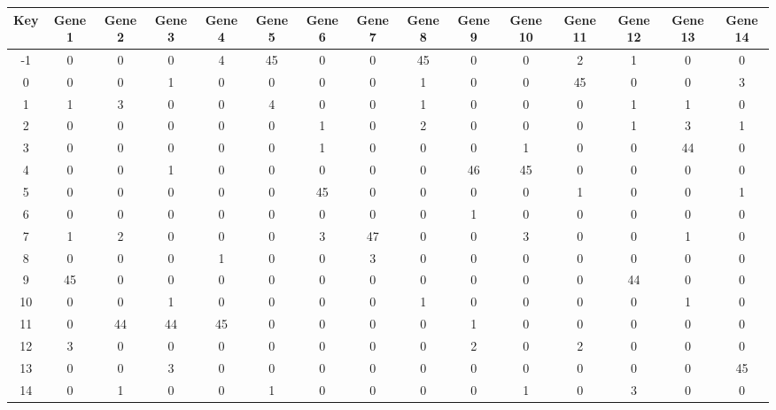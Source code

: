 \begin{tabular}{|c|c|c|c|c|c|c|c|c|c|c|c|c|c|c|}
\hline
Key & Gene 1 & Gene 2 & Gene 3 & Gene 4 & Gene 5 & Gene 6 & Gene 7 & Gene 8 & Gene 9 & Gene 10 & Gene 11 & Gene 12 & Gene 13 & Gene 14 \\
\hline
-1 & 0 & 0 & 0 & 4 & 45 & 0 & 0 & 45 & 0 & 0 & 2 & 1 & 0 & 0 \\
0 & 0 & 0 & 1 & 0 & 0 & 0 & 0 & 1 & 0 & 0 & 45 & 0 & 0 & 3 \\
1 & 1 & 3 & 0 & 0 & 4 & 0 & 0 & 1 & 0 & 0 & 0 & 1 & 1 & 0 \\
2 & 0 & 0 & 0 & 0 & 0 & 1 & 0 & 2 & 0 & 0 & 0 & 1 & 3 & 1 \\
3 & 0 & 0 & 0 & 0 & 0 & 1 & 0 & 0 & 0 & 1 & 0 & 0 & 44 & 0 \\
4 & 0 & 0 & 1 & 0 & 0 & 0 & 0 & 0 & 46 & 45 & 0 & 0 & 0 & 0 \\
5 & 0 & 0 & 0 & 0 & 0 & 45 & 0 & 0 & 0 & 0 & 1 & 0 & 0 & 1 \\
6 & 0 & 0 & 0 & 0 & 0 & 0 & 0 & 0 & 1 & 0 & 0 & 0 & 0 & 0 \\
7 & 1 & 2 & 0 & 0 & 0 & 3 & 47 & 0 & 0 & 3 & 0 & 0 & 1 & 0 \\
8 & 0 & 0 & 0 & 1 & 0 & 0 & 3 & 0 & 0 & 0 & 0 & 0 & 0 & 0 \\
9 & 45 & 0 & 0 & 0 & 0 & 0 & 0 & 0 & 0 & 0 & 0 & 44 & 0 & 0 \\
10 & 0 & 0 & 1 & 0 & 0 & 0 & 0 & 1 & 0 & 0 & 0 & 0 & 1 & 0 \\
11 & 0 & 44 & 44 & 45 & 0 & 0 & 0 & 0 & 1 & 0 & 0 & 0 & 0 & 0 \\
12 & 3 & 0 & 0 & 0 & 0 & 0 & 0 & 0 & 2 & 0 & 2 & 0 & 0 & 0 \\
13 & 0 & 0 & 3 & 0 & 0 & 0 & 0 & 0 & 0 & 0 & 0 & 0 & 0 & 45 \\
14 & 0 & 1 & 0 & 0 & 1 & 0 & 0 & 0 & 0 & 1 & 0 & 3 & 0 & 0 \\
\hline
\end{tabular}